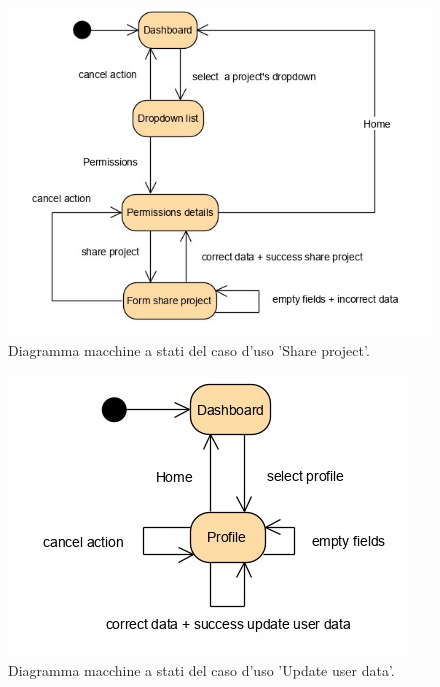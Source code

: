 \begin{figure}[H]
	\centering
	\caption{Diagramma macchine a stati del caso d'uso 'Share project'.}
	\label{fig:diagramma-macchine-stati:share-project}
	\includegraphics[width=\textwidth]{images/diagramma-macchine-stati/share-project}
\end{figure}

\begin{figure}[H]
	\centering
	\caption{Diagramma macchine a stati del caso d'uso 'Update user data'.}
	\label{fig:diagramma-macchine-stati:update-user-data}
	\includegraphics[width=\textwidth]{images/diagramma-macchine-stati/update-user-data}
\end{figure}

